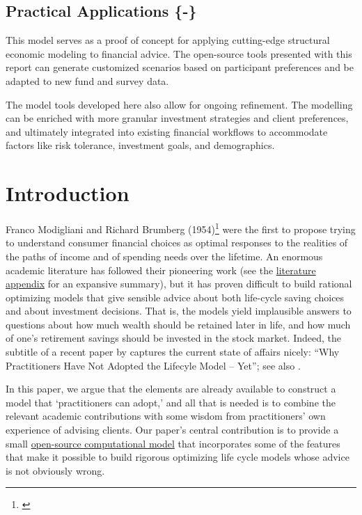 \documentclass{article}
\begin{document}
\subsection{Practical Applications \{-\}}

This model serves as a proof of concept for applying cutting-edge structural economic modeling to financial advice. The open-source tools presented with this report can generate customized scenarios based on participant preferences and be adapted to new fund and survey data.

The model tools developed here also allow for ongoing refinement. The modelling can be enriched with more granular investment strategies and client preferences, and ultimately integrated into existing financial workflows to accommodate factors like risk tolerance, investment goals, and demographics.

\section{Introduction}

Franco Modigliani and Richard Brumberg (1954)\footnote{\cite{2005}} were the first to propose trying to understand consumer financial choices as optimal responses to the realities of the paths of income and of spending needs over the lifetime.
An enormous academic literature has followed their pioneering work (see the \href{\#lit-review}{literature appendix} for an expansive summary),
but it has proven difficult to build rational optimizing models that give sensible advice about both life-cycle saving choices and about investment decisions.
That is, the models yield implausible answers to questions about how much wealth should be retained later in life, and how much of one's retirement savings should be invested in the stock market.
Indeed, the subtitle of a recent paper by \cite{Daga_2023} captures the current state of affairs nicely: ``Why Practitioners Have Not Adopted the Lifecyle Model -- Yet''; see also \cite{DeNardi2016d}.

In this paper, we argue that the elements are already available to construct a model that `practitioners can adopt,' and all that is needed is to combine the relevant academic contributions with some wisdom from practitioners' own experience of advising clients.
Our paper's central contribution is to provide a small \href{github.com/econ-ark/life-cycle-prime-time}{open-source computational model} that incorporates some of the features that make it possible to build rigorous optimizing life cycle models whose advice is not obviously wrong.
\end{document}
